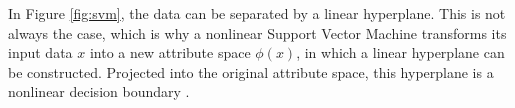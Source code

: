     In Figure \ref{fig:svm}, the data can be separated by a linear hyperplane. This is not always the case, which is why a nonlinear Support Vector Machine transforms its input data $x$ into a new attribute space $\phi(x)$, in which a linear hyperplane can be constructed. Projected into the original attribute space, this hyperplane is a nonlinear decision boundary \cite{DBLP:books/aw/TanSKK2019}.
    